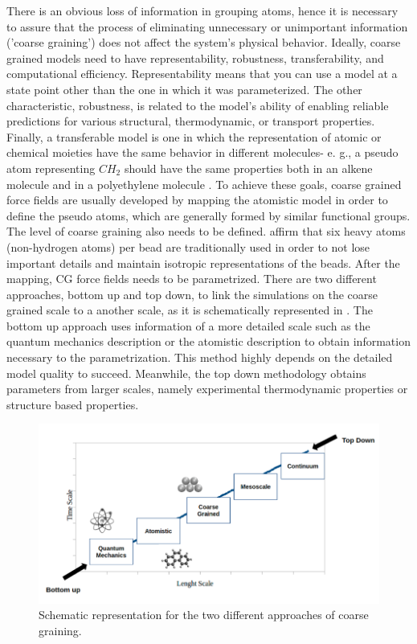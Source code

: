 There is an obvious loss of information in grouping atoms, hence it is necessary to assure that the process of eliminating unnecessary or unimportant information ('coarse graining') does not affect the system's physical behavior. Ideally, coarse grained models need to have representability, robustness, transferability, and computational efficiency. Representability means that you can use a model at a state point other than the one in which it was parameterized. The other characteristic, robustness, is related to the model's ability of enabling reliable predictions for various structural, thermodynamic, or transport properties. Finally, a transferable model is one in which the representation of atomic or chemical moieties have the same behavior in different molecules- e. g., a pseudo atom representing $CH_{2}$ should have the same properties both in an alkene molecule and in a polyethylene molecule     \cite{doi:10.1146/annurev-chembioeng-061312-103314}. To achieve these goals, coarse grained force fields are usually developed by mapping the atomistic model in order to define the pseudo atoms, which are generally formed by similar functional groups. The level of coarse graining also needs to be defined.  affirm that six heavy atoms (non-hydrogen atoms) per bead are traditionally used in order to not lose important details and maintain isotropic representations of the beads. After the mapping, CG force fields needs to be parametrized. There are two different approaches, bottom up and top down, to link the simulations on the coarse grained scale to a another scale, as it is schematically represented in . The bottom up approach uses information of a more detailed scale such as the quantum mechanics description or the atomistic description to obtain information necessary to the parametrization. This method highly depends on the detailed model quality to succeed. Meanwhile, the top down methodology obtains parameters from larger scales, namely experimental thermodynamic properties or structure based properties. 

\begin{figure}[H]
	\centering
	\includegraphics[width=0.99\linewidth]{Figures/multiscale}
	\caption{Schematic representation for the two different approaches of coarse graining.}
	\label{fig:multiscale}
\end{figure}
\FloatBarrier

